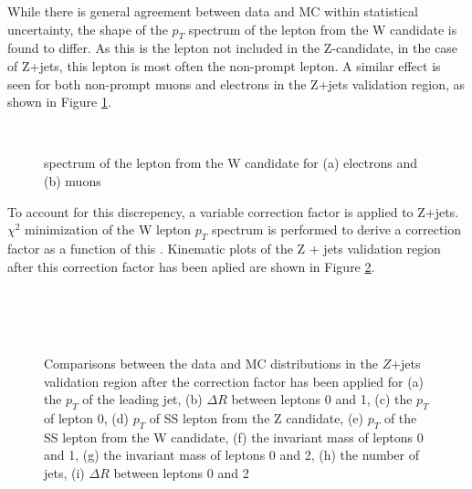 While there is general agreement between data and MC within statistical uncertainty, the shape of the $p_T$ spectrum of the lepton from the W candidate is found to differ. As this is the lepton not included in the Z-candidate, in the case of Z+jets, this lepton is most often the non-prompt lepton. A similar effect is seen for both non-prompt muons and electrons in the Z+jets validation region, as shown in Figure \ref{fig:zjets_flav}.

\begin{figure}[H]
    \\
    \caption{\pt spectrum of the lepton from the W candidate for (a) electrons and (b) muons}
    \label{fig:zjets_flav}
\end{figure}

To account for this discrepency, a variable correction factor is applied to Z+jets. $\chi^2$ minimization of the W lepton $p_T$ spectrum is performed to derive a correction factor as a function of this \pt. Kinematic plots of the Z + jets validation region after this correction factor has been aplied are shown in Figure \ref{fig:zjets_withScale}.

\begin{figure}[H]
    \\
    \\                                 
    \\
    \caption{Comparisons between the data and MC distributions in the $Z$+jets validation region after the correction factor has been applied for (a) the $p_T$ of the leading jet, (b) $\Delta R$ between leptons 0 and 1, (c) the $p_T$ of lepton 0, (d) $p_T$ of SS lepton from the Z candidate, (e) $p_T$ of the SS lepton from the W candidate, (f) the invariant mass of leptons 0 and 1, (g) the invariant mass of leptons 0 and 2, (h) the number of jets, (i) $\Delta R$ between leptons 0 and 2}%
    \label{fig:zjets_withScale}
\end{figure}


